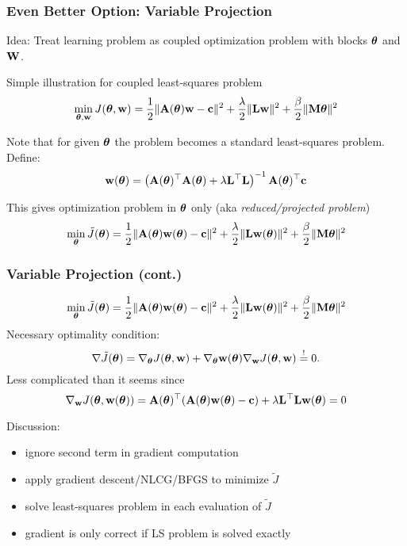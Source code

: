 \documentclass[12pt,fleqn,handout]{beamer}
\begin{document}
\begin{frame}\frametitle{Even Better Option: Variable Projection~\cite{NewmanEtAl2020}}
	Idea: Treat learning problem as coupled optimization problem with blocks ${\boldsymbol \theta}$ and ${\bf W}$. 
	
	Simple illustration for coupled least-squares problem~\cite{GoPe1973,GoPe03,OLearyRust2013}
	$$
		\min_{{\boldsymbol \theta},{\bf w}} J({\boldsymbol \theta},{\bf w}) = {\frac 12} \| {\bf A}({\boldsymbol \theta}) {\bf w} - {\bf c}\|^2 + \frac{\lambda}{2}\| {\bf L} {\bf w}\|^2 + \frac{\beta}{2} \| {\bf M} {\boldsymbol \theta}\|^2
	$$
	
	\pause
	
	Note that for given ${\boldsymbol \theta}$ the problem becomes a standard least-squares problem. Define: 
	$$
		{\bf w}({\boldsymbol \theta}) = \left( {\bf A}({\boldsymbol \theta})^\top {\bf A}({\boldsymbol \theta}) + \lambda {\bf L}^\top {\bf L} \right)^{-1}{{\bf A}({\boldsymbol \theta})^\top {\bf c}}
	$$
	
	\pause
	This gives optimization problem in ${\boldsymbol \theta}$ only (aka \emph{reduced/projected  problem})
	$$
		\min_{{\boldsymbol \theta}} \tilde{J}({\boldsymbol \theta}) = {\frac 12} \| {\bf A}({\boldsymbol \theta}) {\bf w}({\boldsymbol \theta}) - {\bf c}\|^2 + \frac{\lambda}{2}\| {\bf L} {\bf w}({\boldsymbol \theta})\|^2 + \frac{\beta}{2} \| {\bf M} {\boldsymbol \theta}\|^2
	$$
	
\end{frame}
\begin{frame}\frametitle{ Variable Projection (cont.)}
	$$
		\min_{{\boldsymbol \theta}} \tilde{J}({\boldsymbol \theta}) = {\frac 12} \| {\bf A}({\boldsymbol \theta}) {\bf w}({\boldsymbol \theta}) - {\bf c}\|^2 + \frac{\lambda}{2}\| {\bf L} {\bf w}({\boldsymbol \theta})\|^2 + \frac{\beta}{2} \| {\bf M} {\boldsymbol \theta}\|^2
	$$
	Necessary optimality condition:
	$$ 
		\nabla \tilde{J}({\boldsymbol \theta}) = \nabla_{\boldsymbol \theta} J({\boldsymbol \theta},{\bf w}) + \nabla_{\boldsymbol \theta} {\bf w}({\boldsymbol \theta}) \nabla_{{\bf w}} J({\boldsymbol \theta},{\bf w}) \stackrel{!}{=} 0.
	$$
	Less complicated than it seems since
	$$
		\nabla_{{\bf w}} J({\boldsymbol \theta},{\bf w}({\boldsymbol \theta})) = {\bf A}({\boldsymbol \theta})^\top( {\bf A}({\boldsymbol \theta}) {\bf w}({\boldsymbol \theta}) - {\bf c}) + \lambda {\bf L}^\top {\bf L} {\bf w}({\boldsymbol \theta}) = 0
	$$
	
	Discussion:
	\begin{itemize}
		\item ignore second term in gradient computation
		\item apply gradient descent/NLCG/BFGS  to minimize $\tilde{J}$
		\item solve least-squares problem in each evaluation of $\tilde{J}$
		\item gradient is only correct if LS problem is solved exactly
	\end{itemize}
	
\end{frame}
\end{document}
